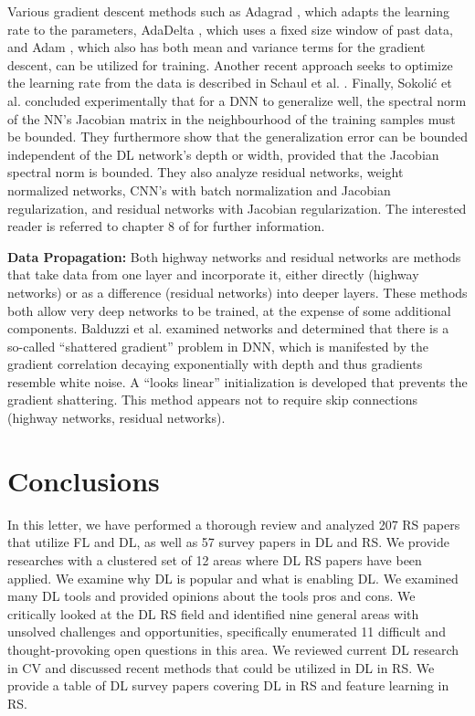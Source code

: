 \documentclass[12pt]{spieman}
\begin{document}
\begin{spacing}{1}
Various gradient descent methods such as Adagrad \cite{duchi2011adaptive} , which adapts the learning rate to the parameters, AdaDelta \cite{zeiler2012adadelta} , which uses a fixed size window of past data, and Adam \cite{kingma2014adam} , which also has both mean and variance terms for the gradient descent, can be utilized for training. Another recent approach seeks to optimize the learning rate from the data is described in Schaul et al. \cite{Schaul2013NoMore} . Finally, Sokoli\'{c} et al. \cite{sokolic2016robust} concluded experimentally that for a DNN to generalize well, the spectral norm of the NN's Jacobian matrix in the neighbourhood of the training samples must be bounded. They furthermore show that the generalization error can be bounded independent of the DL network's depth or width, provided that the Jacobian spectral norm is bounded. They also analyze residual networks, weight normalized networks, CNN's with batch normalization and Jacobian regularization, and residual networks with Jacobian regularization. The interested reader is referred to chapter 8 of \cite{goodfellow2016deep} for further information.

\textbf{Data Propagation:} Both highway networks \cite{srivastava2015highway} and residual networks \cite{he2015deep} are methods that take data from one layer and incorporate it, either directly (highway networks) or as a difference (residual networks) into deeper layers. These methods both allow very deep networks to be trained, at the expense of some additional components. Balduzzi et al. \cite{balduzzi2016neural} examined networks and determined that there is a so-called ``shattered gradient'' problem in DNN, which is manifested by the gradient correlation decaying exponentially with depth and thus gradients resemble white noise. A ``looks linear'' initialization is developed that prevents the gradient shattering. This method appears not to require skip connections (highway networks, residual networks).


\section{Conclusions}
\label{sec:Conclusions}

In this letter, we have performed a thorough review and analyzed 207 RS papers that utilize FL and DL, as well as 57 survey papers in DL and RS. We provide researches with a clustered set of 12 areas where DL RS papers have been applied. We examine why DL is popular and what is enabling DL. We examined many DL tools and provided opinions about the tools pros and cons. We critically looked at the DL RS field and identified nine general areas with unsolved challenges and opportunities, specifically enumerated 11 difficult and thought-provoking open questions in this area. We reviewed current DL research in CV and discussed recent methods that could be utilized in DL in RS. We provide a table of DL survey papers covering DL in RS and feature learning in RS.


\end{spacing}
\end{document}
